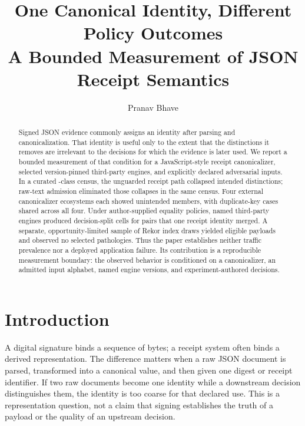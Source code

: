 \documentclass[10pt,twocolumn,letterpaper]{article}
\title{\vspace{-1.4em}\textbf{One Canonical Identity, Different Policy Outcomes}\\
\large A Bounded Measurement of JSON Receipt Semantics\vspace{-0.6em}}
\author{Pranav Bhave}
\date{}
\begin{document}
\maketitle

\begin{abstract}
Signed JSON evidence commonly assigns an identity after parsing and
canonicalization.  That identity is useful only to the extent that the
distinctions it removes are irrelevant to the decisions for which the evidence
is later used.  We report a bounded measurement of that condition for a
JavaScript-style receipt canonicalizer, selected version-pinned third-party
engines, and explicitly declared adversarial inputs.  In a curated
\pnEOneClasses-class census, the unguarded receipt path collapsed
\pnEOneUnguarded{} intended distinctions; raw-text admission eliminated those
collapses in the same census.  Four external canonicalizer ecosystems each
showed \pnEElevenUnintended{} unintended members, with duplicate-key cases
shared across all four.  Under author-supplied equality policies, named
third-party engines produced \pnESixteenCells{} decision-split cells for pairs
that one receipt identity merged.  A separate, opportunity-limited sample of
\pnETwelveDraws{} Rekor index draws yielded \pnETwelveEligible{} eligible
payloads and observed no selected pathologies.  Thus the paper establishes
neither traffic prevalence nor a deployed application failure.  Its
contribution is a reproducible measurement boundary: the observed behavior is
conditioned on a canonicalizer, an admitted input alphabet, named engine
versions, and experiment-authored decisions.
\end{abstract}

\section{Introduction}
\label{sec:intro}

A digital signature binds a sequence of bytes; a receipt system often binds a
derived representation.  The difference matters when a raw JSON document is
parsed, transformed into a canonical value, and then given one digest or receipt
identifier.  If two raw documents become one identity while a downstream
decision distinguishes them, the identity is too coarse for that declared use.
This is a representation question, not a claim that signing establishes the
truth of a payload or the quality of an upstream decision.
\end{document}

